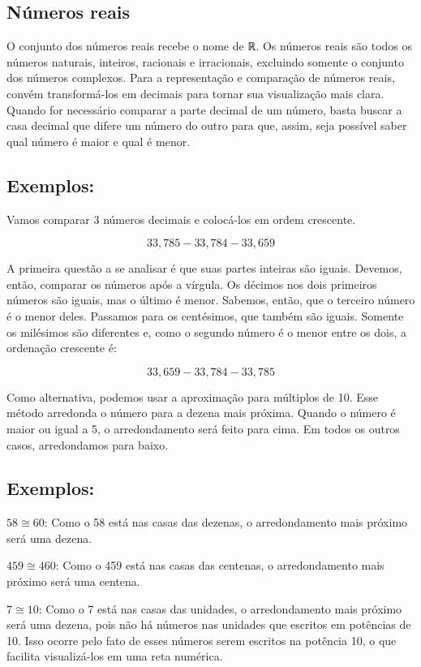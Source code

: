 \subsection{Números reais}

O conjunto dos números reais recebe o nome de ℝ. Os números reais são
todos os números naturais, inteiros, racionais e irracionais, excluindo
somente o conjunto dos números complexos. Para a representação e
comparação de números reais, convém transformá-los em decimais para
tornar sua visualização mais clara. Quando for necessário comparar a
parte decimal de um número, basta buscar a casa decimal que difere um
número do outro para que, assim, seja possível saber qual número é maior
e qual é menor.

\subsection{Exemplos:}

Vamos comparar 3 números decimais e colocá-los em ordem crescente.

$$33,785  - 33,784  - 33,659$$

A primeira questão a se analisar é que suas partes inteiras são iguais.
Devemos, então, comparar os números após a vírgula. Os décimos nos dois
primeiros números são iguais, mas o último é menor. Sabemos, então, que
o terceiro número é o menor deles. Passamos para os centésimos, que
também são iguais. Somente os milésimos são diferentes e, como o segundo
número é o menor entre os dois, a ordenação crescente é:

$$33,659  - 33,784  - 33,785$$

Como alternativa, podemos usar a aproximação para múltiplos de 10. Esse
método arredonda o número para a dezena mais próxima. Quando o número é
maior ou igual a 5, o arredondamento será feito para cima. Em todos os
outros casos, arredondamos para baixo.



\subsection{Exemplos:}

$58\cong 60$: Como o 58 está nas casas das dezenas, o
arredondamento mais próximo será uma dezena.

$459\cong 460$: Como o 459 está nas casas das centenas, o
arredondamento mais próximo será uma centena.

$7\cong 10$: Como o 7 está nas casas das unidades, o
arredondamento mais próximo será uma dezena, pois não há números nas
unidades que escritos em potências de 10. Isso ocorre pelo fato de esses
números serem escritos na potência 10, o que facilita visualizá-los em
uma reta numérica.

